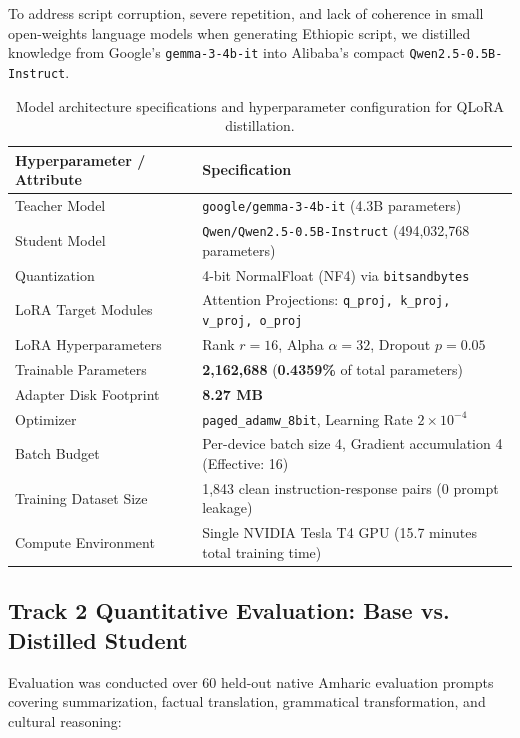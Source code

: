 \documentclass[11pt,a4paper]{article}
\begin{document}
To address script corruption, severe repetition, and lack of coherence in small open-weights language models when generating Ethiopic script, we distilled knowledge from Google's \texttt{gemma-3-4b-it} into Alibaba's compact \texttt{Qwen2.5-0.5B-Instruct}.

\begin{table}[h!]
\centering
\caption{Model architecture specifications and hyperparameter configuration for QLoRA distillation.}
\vspace{4pt}
\begin{tabular}{ll}
    \toprule
    \textbf{Hyperparameter / Attribute} & \textbf{Specification} \\
    \midrule
    Teacher Model & \texttt{google/gemma-3-4b-it} (4.3B parameters) \\
    Student Model & \texttt{Qwen/Qwen2.5-0.5B-Instruct} (494,032,768 parameters) \\
    Quantization & 4-bit NormalFloat (NF4) via \texttt{bitsandbytes} \\
    LoRA Target Modules & Attention Projections: \texttt{q\_proj, k\_proj, v\_proj, o\_proj} \\
    LoRA Hyperparameters & Rank $r=16$, Alpha $\alpha=32$, Dropout $p=0.05$ \\
    Trainable Parameters & \textbf{2,162,688} (\textbf{0.4359\%} of total parameters) \\
    Adapter Disk Footprint & \textbf{8.27 MB} \\
    Optimizer & \texttt{paged\_adamw\_8bit}, Learning Rate $2 \times 10^{-4}$ \\
    Batch Budget & Per-device batch size 4, Gradient accumulation 4 (Effective: 16) \\
    Training Dataset Size & 1,843 clean instruction-response pairs (0 prompt leakage) \\
    Compute Environment & Single NVIDIA Tesla T4 GPU (15.7 minutes total training time) \\
    \bottomrule
\end{tabular}
\end{table}

\subsection{Track 2 Quantitative Evaluation: Base vs. Distilled Student}

Evaluation was conducted over 60 held-out native Amharic evaluation prompts covering summarization, factual translation, grammatical transformation, and cultural reasoning:
\end{document}
